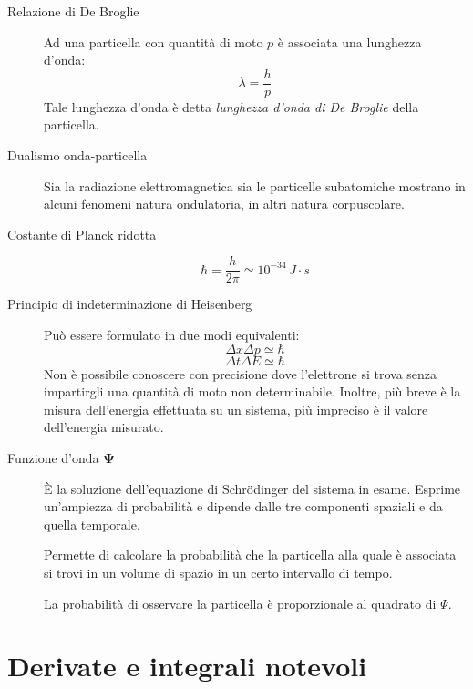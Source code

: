 \documentclass[a4paper,11pt,italian]{article}
\begin{document}
\begin{description}
  \item[Relazione di De Broglie] 
  Ad una particella con quantità di moto $ p $ è associata una lunghezza d'onda:
  \[ \lambda = \frac{h}{p} \] Tale lunghezza d'onda è detta \emph{lunghezza d'onda di De Broglie} della particella.
  
  \item[Dualismo onda-particella] 
  Sia la radiazione elettromagnetica sia le particelle subatomiche mostrano in alcuni fenomeni natura ondulatoria, in altri natura corpuscolare.
  
  \item[Costante di Planck ridotta] 
  \[ \hbar = \frac{h}{2 \pi} \simeq 10^{-34} \, J\cdot s \]
  
  \item[Principio di indeterminazione di Heisenberg] 
  Può essere formulato in due modi equivalenti: 
  \[ \Delta x \Delta p \simeq \hbar \]
  \[ \Delta t \Delta E \simeq \hbar \]
  Non è possibile conoscere con precisione dove l'elettrone si trova senza impartirgli una quantità di moto non determinabile. Inoltre, più breve è la misura dell'energia effettuata su un sistema, più impreciso è il valore dell'energia misurato.
  
  \item[Funzione d'onda $ \mathbf{\Psi} $]
  È la soluzione dell'equazione di Schrödinger del sistema in esame. Esprime un'ampiezza di probabilità e dipende dalle tre componenti spaziali e da quella temporale.
  
  Permette di calcolare la probabilità che la particella alla quale è associata si trovi in un volume di spazio in un certo intervallo di tempo.
  
  La probabilità di osservare la particella è proporzionale al quadrato di $ \Psi $.
\end{description}


\newpage
\section{Derivate e integrali notevoli}
\end{document}
